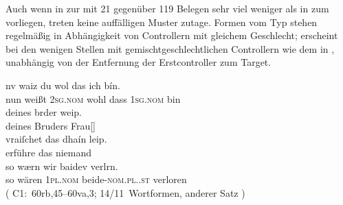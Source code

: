 Auch wenn in  zur \KC{} mit 21 gegenüber 119 Belegen
sehr viel weniger als in  zum \CAO{} vorliegen,
treten keine auffälligen Muster zutage. Formen vom Typ  stehen
regelmäßig in Abhängigkeit von Controllern mit gleichem Geschlecht;
 erscheint bei den wenigen Stellen mit gemischtgeschlechtlichen
Controllern wie dem in , unabhängig von der Entfernung der
Erstcontroller zum Target.

\begin{exe}
\ex \label{ex:combgenddist1}

		\gll nv waiz du wol das ich bín. \\
		     nun weißt \textsc{2sg\subM.nom} wohl dass \textsc{1sg\subF.nom} bin \\
	\sn \gll deines brder weip. \\
	         deines Bruders Frau[\NeutF] \\
	\sn	\gll vraiſchet das {dhaín leip.} \\
		     erführe das niemand \\
	\sn \gll so wærn wir baidev verlrn. \\
		     so wären \textsc{1pl\subMF.nom} beide-\textsc{nom.pl.\NeutMF.st}
		     verloren \\
		\trans {}
			(%
				C1:~60rb,45--60va,3;
				14/11~Wortformen, anderer Satz%
			)

\end{exe}

